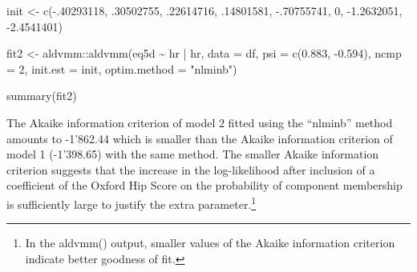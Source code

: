 \documentclass[
]{article}
\newenvironment{Shaded}{\begin{snugshade}}{\end{snugshade}}
\newcommand{\AttributeTok}[1]{\textcolor[rgb]{0.77,0.63,0.00}{#1}}
\newcommand{\DecValTok}[1]{\textcolor[rgb]{0.00,0.00,0.81}{#1}}
\newcommand{\FloatTok}[1]{\textcolor[rgb]{0.00,0.00,0.81}{#1}}
\newcommand{\FunctionTok}[1]{\textcolor[rgb]{0.00,0.00,0.00}{#1}}
\newcommand{\NormalTok}[1]{#1}
\newcommand{\OtherTok}[1]{\textcolor[rgb]{0.56,0.35,0.01}{#1}}
\newcommand{\SpecialCharTok}[1]{\textcolor[rgb]{0.00,0.00,0.00}{#1}}
\newcommand{\StringTok}[1]{\textcolor[rgb]{0.31,0.60,0.02}{#1}}
\begin{document}
\begin{Shaded}
\begin{Highlighting}[]
\NormalTok{init }\OtherTok{\textless{}{-}} \FunctionTok{c}\NormalTok{(}\SpecialCharTok{{-}}\NormalTok{.}\DecValTok{40293118}\NormalTok{, .}\DecValTok{30502755}\NormalTok{, .}\DecValTok{22614716}\NormalTok{, .}\DecValTok{14801581}\NormalTok{, }\SpecialCharTok{{-}}\NormalTok{.}\DecValTok{70755741}\NormalTok{, }\DecValTok{0}\NormalTok{, }
          \SpecialCharTok{{-}}\FloatTok{1.2632051}\NormalTok{, }\SpecialCharTok{{-}}\FloatTok{2.4541401}\NormalTok{)}

\NormalTok{fit2 }\OtherTok{\textless{}{-}}\NormalTok{ aldvmm}\SpecialCharTok{::}\FunctionTok{aldvmm}\NormalTok{(eq5d }\SpecialCharTok{\textasciitilde{}}\NormalTok{ hr }\SpecialCharTok{|}\NormalTok{ hr,}
                       \AttributeTok{data =}\NormalTok{ df,}
                       \AttributeTok{psi =} \FunctionTok{c}\NormalTok{(}\FloatTok{0.883}\NormalTok{, }\SpecialCharTok{{-}}\FloatTok{0.594}\NormalTok{),}
                       \AttributeTok{ncmp =} \DecValTok{2}\NormalTok{,}
                       \AttributeTok{init.est =}\NormalTok{ init,}
                       \AttributeTok{optim.method =} \StringTok{"nlminb"}\NormalTok{)}

\FunctionTok{summary}\NormalTok{(fit2)}
\end{Highlighting}
\end{Shaded}

The Akaike information criterion of model 2 fitted using the ``nlminb'' method amounts to -1'862.44 which is smaller than the Akaike information criterion of model 1 (-1'398.65) with the same method. The smaller Akaike information criterion suggests that the increase in the log-likelihood after inclusion of a coefficient of the Oxford Hip Score on the probability of component membership is sufficiently large to justify the extra parameter.\footnote{In the aldvmm() output, smaller values of the Akaike information criterion indicate better goodness of fit.}
\end{document}
